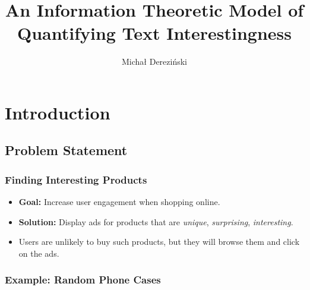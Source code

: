 \documentclass{beamer}
\title[Model of Text Interestingness]{An Information Theoretic
    Model of Quantifying Text Interestingness}
\author{Michał Dereziński}
\begin{document}
\begin{frame}
  \titlepage
\end{frame}

\linespread{1.3}

\section{Introduction}
\subsection{Problem Statement}
\begin{frame}
\frametitle{Finding Interesting Products}
\begin{itemize}
\item {\bf Goal:} Increase user engagement when shopping online.
\item {\bf Solution:} Display ads for products that are {\em unique},
  {\em surprising}, {\em interesting}. 
\item Users are unlikely to buy such products, but they will browse
  them and click on the ads. 
\end{itemize}
\end{frame}

\begin{frame}
\frametitle{Example: Random Phone Cases}
\begin{figure}
\centering
{}
\label{fig:boring}
\end{figure}
\end{frame}
\end{document}
